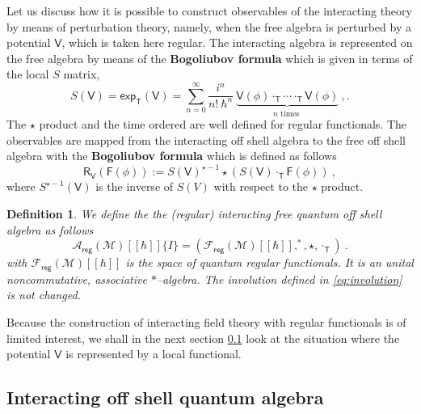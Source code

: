 \documentclass[11pt]{book}
\newcommand{\reg}{\mathsf{reg}}
\renewcommand{\exp}{\mathsf{exp}}
\newcommand{\Acal}{\mathcal{A}}
\newcommand{\Fcal}{\mathcal{F}}
\newcommand{\Mcal}{\mathcal{M}}
\newcommand{\Fsf}{\mathsf{F}}
\newcommand{\Rsf}{\mathsf{R}}
\newcommand{\Tsf}{\mathsf{T}}
\newcommand{\Vsf}{\mathsf{V}}
\theoremstyle{break}
\newtheorem{definition}{Definition}[chapter]
\begin{document}
Let us discuss how it is possible to construct observables of the interacting theory by means of perturbation theory, namely, when the free algebra is perturbed by a potential $\Vsf$, which is taken here regular. The interacting algebra is represented on the free algebra by means of the \textbf{Bogoliubov formula} which is given in terms of the local $S$ matrix, 
%
\begin{equation}
S(\Vsf) = \exp_\Tsf\left(\Vsf\right) = \sum^\infty_{n=0} \frac{i^n}{n!\ \hbar^n} \ \underbrace{\Vsf(\phi) \cdot_\Tsf \cdots \cdot_\Tsf \Vsf(\phi)}_{n \mbox{ times }} \ ,.
\label{eq:S_matrix}
\end{equation}
%
The $\star$ product and the time ordered are well defined for regular functionals. The observables are mapped from the interacting off shell algebra to the free off shell algebra with the \textbf{Bogoliubov formula} \cite{DF_2004} which is defined as follows
%
\begin{equation}
\Rsf_\Vsf(\Fsf(\phi)) := S(\Vsf)^{\star-1} \star \left( S(\Vsf) \cdot_\Tsf \Fsf(\phi) \right) \ ,
\label{eq:bogoliubov} 
\end{equation}
%
where $S^{\star-1}(\Vsf)$ is the inverse of $S(V)$ with respect to the $\star$ product. 


\begin{definition}\label{def:alg_qT_reg}
We define the the (regular) interacting free quantum off shell algebra as follows
%
\begin{equation*}
\Acal_\reg(\Mcal)[[\hbar]]\{I\} = \left(\Fcal_\reg(\Mcal)[[\hbar]] , ^\ast , \star , \cdot_\Tsf \right) \ . 
\end{equation*}
%
with $\Fcal_\reg(\Mcal)[[\hbar]]$ is the space of quantum regular functionals. It is an unital noncommutative, associative $\ast$--algebra. The involution defined in \eqref{eq:involution} is not changed. 
\end{definition}


Because the construction of interacting field theory with regular functionals is of limited interest, we shall in the next section \ref{p:INT_Q_ALG} look at the situation where the potential $\Vsf$ is represented by a local functional.


\subsection{Interacting off shell quantum algebra}
\label{p:INT_Q_ALG}
\end{document}
